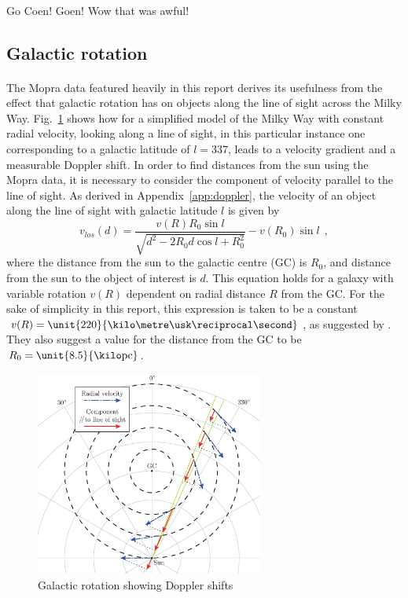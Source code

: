 \documentclass[a4paper, titlepage, oneside]{article}
\newcommand{\parsec}{\mathrm{pc}}
\begin{document}
\begin{multicols}{2}
\paragraph{}
Go Coen! Goen! Wow that was awful!

\subsection{Galactic rotation}
\label{sec:gal-rot}
\paragraph{}
The Mopra data featured heavily in this report \parencite{Burton:2013} derives its usefulness from the effect that galactic rotation has on objects along the line of sight across the Milky Way. Fig.~\ref{fig:gal-rot} shows how for a simplified model of the Milky Way with constant radial velocity, looking along a line of sight, in this particular instance one corresponding to a galactic latitude of \(l=337\), leads to a velocity gradient and a measurable Doppler shift. In order to find distances from the sun using the Mopra data, it is necessary to consider the component of velocity parallel to the line of sight. As derived in Appendix~\ref{app:doppler}, the velocity of an object along the line of sight with galactic latitude \(l\) is given by
\begin{equation}
  v_{los}(d)=\frac{v(R)R_0\sin{l}}{\sqrt{d^2-2R_0d\cos{l}+R_0^2}}-v(R_0)\sin{l}\;\,,
\end{equation}
where the distance from the sun to the galactic centre (GC) is \(R_0\), and distance from the sun to the object of interest is \(d\). This equation holds for a galaxy with variable rotation \(v(R)\) dependent on radial distance \(R\) from the GC. For the sake of simplicity in this report, this expression is taken to be a constant \(v(R)=\unit{220}{\kilo\metre\usk\reciprocal\second}\), as suggested by \textcite{Kerr:1986}. They also suggest a value for the distance from the GC to be \(R_0=\unit{8.5}{\kilo\parsec}\).

\begin{figure}[H]
  \centering
  \includegraphics[width = 7.5cm]{figures/galactic-rotation} %
  \caption{Galactic rotation showing Doppler shifts}
  \label{fig:gal-rot}
\end{figure}


\end{multicols}
\end{document}

